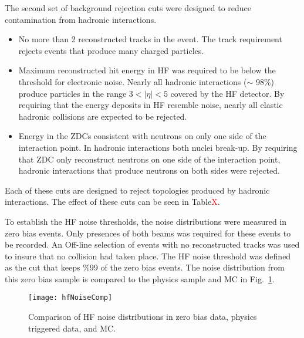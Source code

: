       The second set of background rejection cuts were designed to 
        reduce contamination from hadronic interactions. 
      \begin{itemize}
  	    \item No more than 2 reconstructed tracks in the event.
          The track requirement rejects events that produce many charged 
          particles.
  	    \item Maximum reconstructed hit energy in HF was required to be below 
            the threshold for electronic noise. 
          Nearly all hadronic interactions ($\sim$ 98\%) produce particles in 
            the range $3<|\eta|<5$ covered by the HF detector.
          By requiring that the energy deposits in HF resemble noise, nearly all
            elastic hadronic collisions are expected to be rejected.
  	    \item Energy in the ZDCs consistent with neutrons on only one side 
            of the interaction point.
          In hadronic interactions both nuclei break-up. 
          By requiring that ZDC only reconstruct neutrons on one side of the 
            interaction point, hadronic interactions that produce neutrons on 
            both sides were rejected.
      \end{itemize}
      Each of these cuts are designed to reject topologies produced by hadronic
        interactions.
      The effect of these cuts can be seen in Table\textcolor{red}{X}.

      To establish the HF noise thresholds, the noise distributions were 
        measured in zero bias events. 
      Only presences of both beams was required for these events to be recorded. 
      An Off-line selection of events with no reconstructed tracks was used
        to insure that no collision had taken place. 
      The HF noise threshold was defined as the cut that keeps \%99 of the 
        zero bias events.
      The noise distribution from this zero bias sample is compared to the 
        physics sample and MC in Fig.~\ref{fig:hfNoiseDist}.

      \begin{figure}[!Hhbt]
        \centering
        \texttt{[image: hfNoiseComp]}
        \caption{Comparison of HF noise distributions in zero bias data, 
          physics triggered data, and MC.}
        \label{fig:hfNoiseDist}
      \end{figure}


